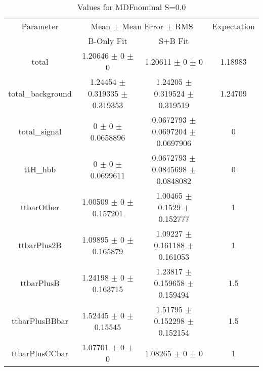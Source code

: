 \begin{table}
\centering
\caption{Values for MDFnominal S=0.0}
\begin{tabular}{cccc}
\toprule
Parameter & \multicolumn{2}{c}{Mean $\pm$ Mean Error $\pm$ RMS} & Expectation\\
 & B-Only Fit & S+B Fit & \\
\midrule
total & \num{1.20646} $\pm$ \num{0} $\pm$ \num{0} & \num{1.20611} $\pm$ \num{0} $\pm$ \num{0} & \num{1.18983}\\
total\_background & \num{1.24454} $\pm$ \num{0.319335} $\pm$ \num{0.319353} & \num{1.24205} $\pm$ \num{0.319524} $\pm$ \num{0.319519} & \num{1.24709}\\
total\_signal & \num{0} $\pm$ \num{0} $\pm$ \num{0.0658896} & \num{0.0672793} $\pm$ \num{0.0697204} $\pm$ \num{0.0697906} & \num{0}\\
ttH\_hbb & \num{0} $\pm$ \num{0} $\pm$ \num{0.0699611} & \num{0.0672793} $\pm$ \num{0.0845698} $\pm$ \num{0.0848082} & \num{0}\\
ttbarOther & \num{1.00509} $\pm$ \num{0} $\pm$ \num{0.157201} & \num{1.00465} $\pm$ \num{0.1529} $\pm$ \num{0.152777} & \num{1}\\
ttbarPlus2B & \num{1.09895} $\pm$ \num{0} $\pm$ \num{0.165879} & \num{1.09227} $\pm$ \num{0.161188} $\pm$ \num{0.161053} & \num{1}\\
ttbarPlusB & \num{1.24198} $\pm$ \num{0} $\pm$ \num{0.163715} & \num{1.23817} $\pm$ \num{0.159658} $\pm$ \num{0.159494} & \num{1.5}\\
ttbarPlusBBbar & \num{1.52445} $\pm$ \num{0} $\pm$ \num{0.15545} & \num{1.51795} $\pm$ \num{0.152298} $\pm$ \num{0.152154} & \num{1.5}\\
ttbarPlusCCbar & \num{1.07701} $\pm$ \num{0} $\pm$ \num{0} & \num{1.08265} $\pm$ \num{0} $\pm$ \num{0} & \num{1}\\
\bottomrule
\end{tabular}
\end{table}